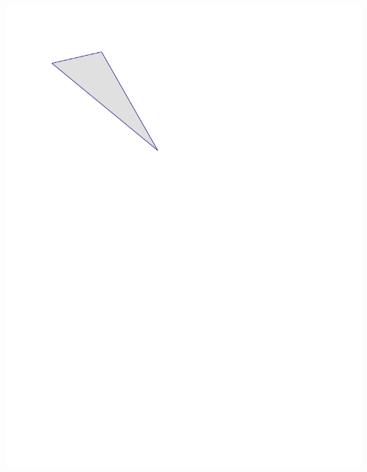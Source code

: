 \begin{prob}
\begin{fullwidth}
\includegraphics{../graphics/triangle.pdf}
\end{fullwidth}

\end{prob}
\vfill
